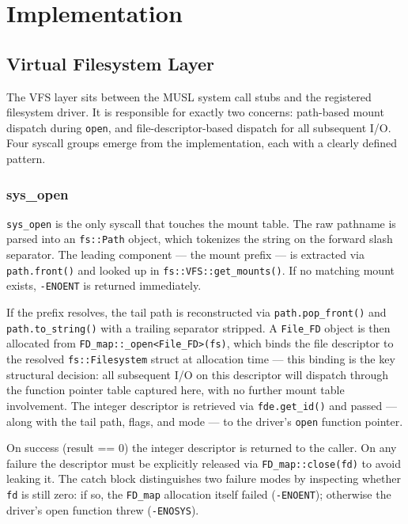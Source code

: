 \documentclass[12pt, a4paper, oneside]{report}
\begin{document}
\chapter{Implementation}
\label{chap:implementation}

\section{Virtual Filesystem Layer}
\label{sec:impl-vfs}

The VFS layer sits between the MUSL system call stubs and the registered
filesystem driver.  It is responsible for exactly two concerns: path-based mount
dispatch during \texttt{open}, and file-descriptor-based dispatch for all
subsequent I/O.  Four syscall groups emerge from the implementation, each with a
clearly defined pattern.

\subsection{sys\_open}

\texttt{sys\_open} is the only syscall that touches the mount table.  The raw
pathname is parsed into an \texttt{fs::Path} object, which tokenizes the string
on the forward slash separator.  The leading component --- the mount prefix ---
is extracted via \texttt{path.front()} and looked up in
\texttt{fs::VFS::get\_mounts()}.  If no matching mount exists,
\texttt{-ENOENT} is returned immediately.

If the prefix resolves, the tail path is reconstructed via
\texttt{path.pop\_front()} and \texttt{path.to\_string()} with a trailing
separator stripped.  A \texttt{File\_FD} object is then allocated from
\texttt{FD\_map::\_open<File\_FD>(fs)}, which binds the file descriptor to the
resolved \texttt{fs::Filesystem} struct at allocation time --- this binding is
the key structural decision: all subsequent I/O on this descriptor will dispatch
through the function pointer table captured here, with no further mount table
involvement.  The integer descriptor is retrieved via \texttt{fde.get\_id()} and
passed --- along with the tail path, flags, and mode --- to the driver's
\texttt{open} function pointer.

On success (result == 0) the integer descriptor is returned to the caller.  On
any failure the descriptor must be explicitly released via
\texttt{FD\_map::close(fd)} to avoid leaking it.  The catch block distinguishes
two failure modes by inspecting whether \texttt{fd} is still zero: if so, the
\texttt{FD\_map} allocation itself failed (\texttt{-ENOENT}); otherwise the
driver's open function threw (\texttt{-ENOSYS}).
\end{document}
